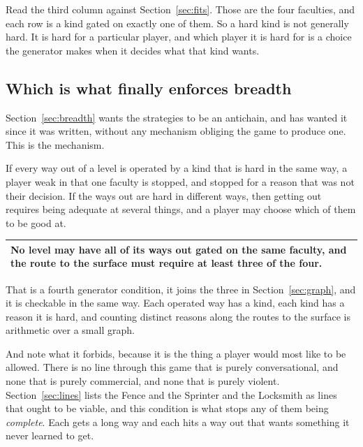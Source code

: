 \documentclass[11pt,a4paper]{article}
\begin{document}
\begin{sectionbox}
Read the third column against Section~\ref{sec:fits}. Those are the four faculties, and each row is
a kind gated on exactly one of them. So a hard kind is not generally hard. It is hard for a
particular player, and which player it is hard for is a choice the generator makes when it decides
what that kind wants.
\end{sectionbox}

\subsection{Which is what finally enforces breadth}

Section~\ref{sec:breadth} wants the strategies to be an antichain, and has wanted it since it was
written, without any mechanism obliging the game to produce one. This is the mechanism.

If every way out of a level is operated by a kind that is hard in the same way, a player weak in
that one faculty is stopped, and stopped for a reason that was not their decision. If the ways out
are hard in different ways, then getting out requires being adequate at several things, and a
player may choose which of them to be good at.

\begin{center}
\begin{tabular}{@{}>{\raggedright\arraybackslash}p{}@{}}
\toprule
\textbf{No level may have all of its ways out gated on the same faculty, and the route to the
surface must require at least three of the four.} \\
\bottomrule
\end{tabular}
\end{center}

That is a fourth generator condition, it joins the three in Section~\ref{sec:graph}, and it is
checkable in the same way. Each operated way has a kind, each kind has a reason it is hard, and
counting distinct reasons along the routes to the surface is arithmetic over a small graph.

\begin{alarmbox}
And note what it forbids, because it is the thing a player would most like to be allowed. There is
no line through this game that is purely conversational, and none that is purely commercial, and
none that is purely violent. Section~\ref{sec:lines} lists the Fence and the Sprinter and the
Locksmith as lines that ought to be viable, and this condition is what stops any of them being
\emph{complete}. Each gets a long way and each hits a way out that wants something it never
learned to get.
\end{alarmbox}
\end{document}
